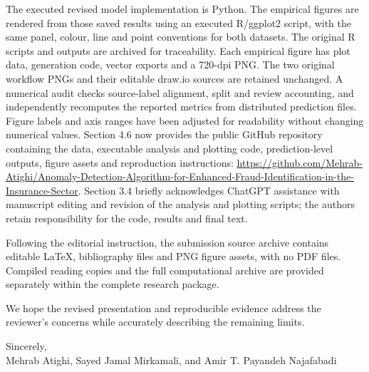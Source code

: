 \documentclass[11pt,a4paper]{article}
\begin{document}
The executed revised model implementation is Python. The empirical figures
are rendered from those saved results using an executed R/ggplot2 script,
with the same panel, colour, line and point conventions for both datasets.
The original R scripts and outputs are archived for traceability. Each
empirical figure has plot data, generation code, vector exports and a
720-dpi PNG. The two original workflow PNGs and their editable draw.io
sources are retained unchanged. A numerical audit checks
source-label alignment, split and review accounting, and independently
recomputes the reported metrics from distributed prediction files.
Figure labels and axis ranges have been adjusted for readability without
changing numerical values. Section 4.6 now provides the public GitHub
repository containing the data, executable analysis and plotting code,
prediction-level outputs, figure assets and reproduction instructions:
\url{https://github.com/Mehrab-Atighi/Anomaly-Detection-Algorithm-for-Enhanced-Fraud-Identification-in-the-Insurance-Sector}.
Section 3.4 briefly
acknowledges ChatGPT assistance with manuscript editing and revision of the
analysis and plotting scripts; the authors retain responsibility for the
code, results and final text.

Following the editorial instruction, the submission source archive contains
editable LaTeX, bibliography files and PNG figure assets, with no PDF files.
Compiled reading copies and the full computational archive are provided
separately within the complete research package.

We hope the revised presentation and reproducible evidence address the
reviewer's concerns while accurately describing the remaining limits.

Sincerely,\\
Mehrab Atighi, Sayed Jamal Mirkamali, and Amir T. Payandeh Najafabadi
\end{document}
